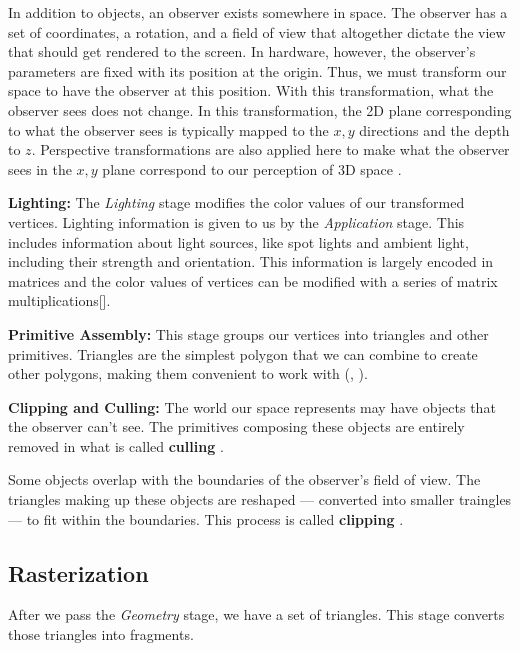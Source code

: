 In addition to objects, an observer exists somewhere in space.
The observer has a set of coordinates, a rotation, and a field of view that altogether dictate the view that should get rendered to the screen.
In hardware, however, the observer's parameters are fixed with its position at the origin.
Thus, we must transform our space to have the observer at this position.
With this transformation, what the observer sees does not change.
In this transformation, the 2D plane corresponding to what the observer
sees is typically mapped to the $x,y$ directions and the depth to $z$.
Perspective transformations are also applied here to make what the observer sees in the $x,y$ plane correspond to our perception of 3D space \cite{agoston2005transformations}.


\textbf{Lighting:}
The \textit{Lighting} stage modifies the color values of our transformed vertices.
Lighting information is given to us by the \textit{Application} stage.
This includes information about light sources, like spot lights and ambient
light, including their strength and orientation.
This information is largely encoded in matrices and the color values of
vertices can be modified with a series of matrix multiplications[\cite{nvidia256}].

\textbf{Primitive Assembly:}
This stage groups our vertices into triangles and other primitives.
Triangles are the simplest polygon that we can combine to create other polygons,
making them convenient to work with (\cite{wiki:overview}, \cite{scratchapixelRasterization}).

\textbf{Clipping and Culling:}
The world our space represents may have objects that the observer can't see.
The primitives composing these objects are entirely removed in what is called \textbf{culling} \cite{graphicscompendiumGraphicsCompendium}.

Some objects overlap with the boundaries of the observer's field of view. The
triangles making up these objects are reshaped --- converted into smaller traingles ---
to fit within the boundaries.
This process is called \textbf{clipping} \cite{graphicscompendiumGraphicsCompendium}.

\subsection{Rasterization}

After we pass the \textit{Geometry} stage, we have a set of triangles.
This stage converts those triangles into fragments.

